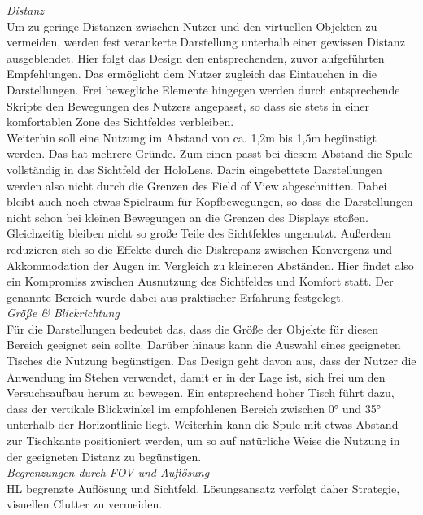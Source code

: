 \textit{Distanz}\\
Um zu geringe Distanzen zwischen Nutzer und den virtuellen Objekten zu vermeiden, werden fest verankerte Darstellung unterhalb einer gewissen Distanz ausgeblendet. Hier folgt das Design den entsprechenden, zuvor aufgeführten Empfehlungen. Das ermöglicht dem Nutzer zugleich das Eintauchen in die Darstellungen. Frei bewegliche Elemente hingegen werden durch entsprechende Skripte den Bewegungen des Nutzers angepasst, so dass sie stets in einer komfortablen Zone des Sichtfeldes verbleiben.\\

Weiterhin soll eine Nutzung im Abstand von ca. 1,2m bis 1,5m begünstigt werden. Das hat mehrere Gründe. Zum einen passt bei diesem Abstand die Spule vollständig in das Sichtfeld der HoloLens. Darin eingebettete Darstellungen werden also nicht durch die Grenzen des Field of View abgeschnitten. Dabei bleibt auch noch etwas Spielraum für Kopfbewegungen, so dass die Darstellungen nicht schon bei kleinen Bewegungen an die Grenzen des Displays stoßen. Gleichzeitig bleiben nicht so große Teile des Sichtfeldes ungenutzt. Außerdem reduzieren sich so die Effekte durch die Diskrepanz zwischen Konvergenz und Akkommodation der Augen im Vergleich zu kleineren Abständen. Hier findet also ein Kompromiss zwischen Ausnutzung des Sichtfeldes und Komfort statt. Der genannte Bereich wurde dabei aus praktischer Erfahrung festgelegt.\\

\textit{Größe \& Blickrichtung}\\
Für die Darstellungen bedeutet das, dass die Größe der Objekte für diesen Bereich geeignet sein sollte. Darüber hinaus kann die Auswahl eines geeigneten Tisches die Nutzung begünstigen. Das Design geht davon aus, dass der Nutzer die Anwendung im Stehen verwendet, damit er in der Lage ist, sich frei um den Versuchsaufbau herum zu bewegen. Ein entsprechend hoher Tisch führt dazu, dass der vertikale Blickwinkel im empfohlenen Bereich zwischen 0° und 35° unterhalb der Horizontlinie liegt. Weiterhin kann die Spule mit etwas Abstand zur Tischkante positioniert werden, um so auf natürliche Weise die Nutzung in der geeigneten Distanz zu begünstigen.\\

\textit{Begrenzungen durch FOV und Auflösung}\\
HL begrenzte Auflösung und Sichtfeld. Lösungsansatz verfolgt daher Strategie, visuellen Clutter zu vermeiden. \\

